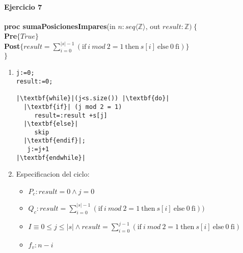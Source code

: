\documentclass{article}
\begin{document}
\paragraph{Ejercicio 7\\}
\noindent
\textbf{proc sumaPosicionesImpares}(in $n: seq\langle\mathbb{Z}\rangle$, out $result: \mathbb{Z})\ \{$\smallskip \\
\hspace*{6mm}\textbf{Pre}$\{True \}$\\
\hspace*{6mm}\textbf{Post}$\{ result=\sum_{i=0}^{|s|-1}(\textrm{if}\ i\ mod\ 2=1\ \textrm{then}\ s[i]\ \textrm{else}\ 0\ \textrm{fi})\}$\\
$\}$\medskip\\

\noindent
\begin{enumerate}[label=\alph*)]
	\item 

\begin{lstlisting}
j:=0;
result:=0;

|\textbf{while}|(j<s.size()) |\textbf{do}|
  |\textbf{if}| (j mod 2 = 1) 
     result=:result +s[j]
  |\textbf{else}|
     skip
  |\textbf{endif}|;
   j:=j+1
|\textbf{endwhile}|
\end{lstlisting}
	\item
	
 Especificacion del ciclo:
	\begin{itemize}
		\item $P_c: result=0 \wedge j=0$
		\item $Q_c: result=\sum_{i=0}^{|s|-1}(\textrm{if}\ i\ mod\ 2=1\ \textrm{then}\ s[i]\ \textrm{else}\ 0\ \textrm{fi}))$
		\item $I\equiv 0\leq j\leq |s| \wedge result=\sum_{i=0}^{j-1}(\textrm{if}\ i\ mod\ 2=1\ \textrm{then}\ s[i]\ \textrm{else}\ 0\ \textrm{fi})$
		\item $f_v:n-i$
	\end{itemize}
	

\end{enumerate}
\end{document}
